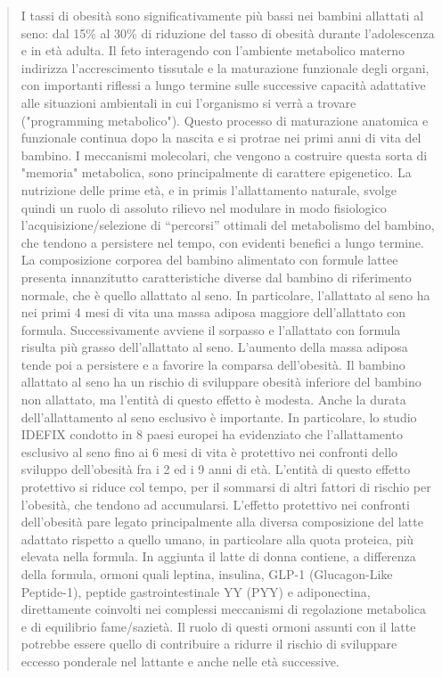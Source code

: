 \documentclass[]{article}
\begin{document}
\begin{quote}
I tassi di obesità sono significativamente più bassi nei bambini
allattati al seno: dal 15\% al 30\% di riduzione del tasso di obesità
durante l'adolescenza e in età adulta. Il feto interagendo con
l'ambiente metabolico materno indirizza l'accrescimento tissutale e la
maturazione funzionale degli organi, con importanti riflessi a lungo
termine sulle successive capacità adattative alle situazioni ambientali
in cui l'organismo si verrà a trovare ("programming metabolico"). Questo
processo di maturazione anatomica e funzionale continua dopo la nascita
e si protrae nei primi anni di vita del bambino. I meccanismi
molecolari, che vengono a costruire questa sorta di "memoria"
metabolica, sono principalmente di carattere epigenetico. La nutrizione
delle prime età, e in primis l'allattamento naturale, svolge quindi un
ruolo di assoluto rilievo nel modulare in modo fisiologico
l'acquisizione/selezione di ``percorsi'' ottimali del metabolismo del
bambino, che tendono a persistere nel tempo, con evidenti benefici a
lungo termine. La composizione corporea del bambino alimentato con
formule lattee presenta innanzitutto caratteristiche diverse dal bambino
di riferimento normale, che è quello allattato al seno. In particolare,
l'allattato al seno ha nei primi 4 mesi di vita una massa adiposa
maggiore dell'allattato con formula. Successivamente avviene il sorpasso
e l'allattato con formula risulta più grasso dell'allattato al seno.
L'aumento della massa adiposa tende poi a persistere e a favorire la
comparsa dell'obesità. Il bambino allattato al seno ha un rischio di
sviluppare obesità inferiore del bambino non allattato, ma l'entità di
questo effetto è modesta. Anche la durata dell'allattamento al seno
esclusivo è importante. In particolare, lo studio IDEFIX condotto in 8
paesi europei ha evidenziato che l'allattamento esclusivo al seno fino
ai 6 mesi di vita è protettivo nei confronti dello sviluppo dell'obesità
fra i 2 ed i 9 anni di età. L'entità di questo effetto protettivo si
riduce col tempo, per il sommarsi di altri fattori di rischio per
l'obesità, che tendono ad accumularsi. L'effetto protettivo nei
confronti dell'obesità pare legato principalmente alla diversa
composizione del latte adattato rispetto a quello umano, in particolare
alla quota proteica, più elevata nella formula. In aggiunta il latte di
donna contiene, a differenza della formula, ormoni quali leptina,
insulina, GLP-1 (Glucagon-Like Peptide-1), peptide gastrointestinale YY
(PYY) e adiponectina, direttamente coinvolti nei complessi meccanismi di
regolazione metabolica e di equilibrio fame/sazietà. Il ruolo di questi
ormoni assunti con il latte potrebbe essere quello di contribuire a
ridurre il rischio di sviluppare eccesso ponderale nel lattante e anche
nelle età successive.


\end{quote}
\end{document}
